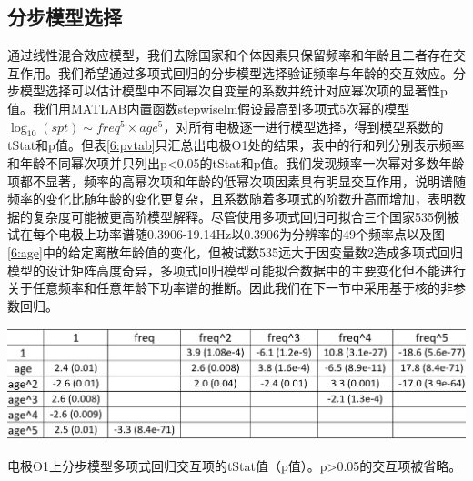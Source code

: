 \subsection{分步模型选择}
通过线性混合效应模型，我们去除国家和个体因素只保留频率和年龄且二者存在交互作用。我们希望通过多项式回归的分步模型选择验证频率与年龄的交互效应。分步模型选择可以估计模型中不同幂次自变量的系数并统计对应幂次项的显著性p值。我们用MATLAB内置函数stepwiselm假设最高到多项式5次幂的模型$\log_{10}(spt)\sim{freq^5\times{age^5}}$，对所有电极逐一进行模型选择，得到模型系数的tStat和p值。但表\ref{6:pvtab}只汇总出电极O1处的结果，表中的行和列分别表示频率和年龄不同幂次项并只列出p<0.05的tStat和p值。我们发现频率一次幂对多数年龄项都不显著，频率的高幂次项和年龄的低幂次项因素具有明显交互作用，说明谱随频率的变化比随年龄的变化更复杂，且系数随着多项式的阶数升高而增加，表明数据的复杂度可能被更高阶模型解释。尽管使用多项式回归可拟合三个国家535例被试在每个电极上功率谱随0.3906-19.14Hz以0.3906为分辨率的49个频率点以及图\ref{6:age}中的给定离散年龄值的变化，但被试数535远大于因变量数2造成多项式回归模型的设计矩阵高度奇异，多项式回归模型可能拟合数据中的主要变化但不能进行关于任意频率和任意年龄下功率谱的推断。因此我们在下一节中采用基于核的非参数回归。
\begin{table}[!h]
\includegraphics[width=\linewidth]{pic/Norm/pvtab.png}
\caption{电极O1上分步模型多项式回归交互项的tStat值（p值）。p>0.05的交互项被省略。}
\label{6:pvtab}
\end{table}

